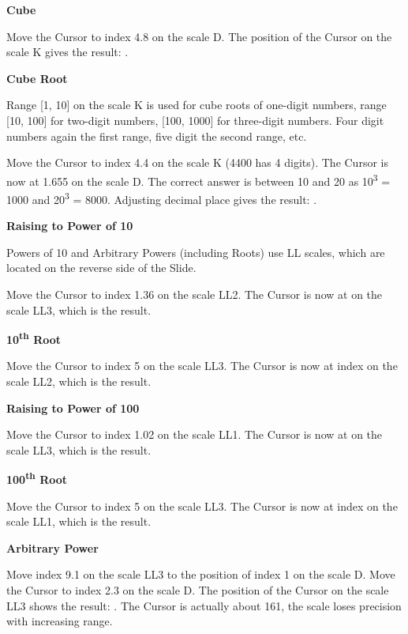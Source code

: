 \begin{multicols*}{3}
{  
  \textbf{Cube}

Move the Cursor to index 4.8 on the scale D.
The position of the Cursor on the scale K gives the result: .

  \textbf{Cube Root}

\footnotesize Range [1, 10] on the scale K is used for cube roots of one-digit numbers, range [10, 100] for two-digit numbers, [100, 1000] for three-digit numbers. Four digit numbers again the first range, five digit the second range, etc. \normalsize

Move the Cursor to index 4.4 on the scale K (4400 has 4 digits).
The Cursor is now at 1.655 on the scale D.
The correct answer is between 10 and 20 as 10\textsuperscript{3} = 1000 and 20\textsuperscript{3} = 8000. Adjusting decimal place gives the result: .

  \textbf{Raising to Power of 10}

\footnotesize Powers of 10 and Arbitrary Powers (including Roots) use LL scales, which are located on the reverse side of the Slide. \normalsize

Move the Cursor to index 1.36 on the scale LL2.
The Cursor is now at  on the scale LL3, which is the result.

  \textbf{10\textsuperscript{th} Root}

Move the Cursor to index 5 on the scale LL3.
The Cursor is now at index  on the scale LL2, which is the result.

  \textbf{Raising to Power of 100}

Move the Cursor to index 1.02 on the scale LL1.
The Cursor is now at  on the scale LL3, which is the result.

  \textbf{100\textsuperscript{th} Root}

Move the Cursor to index 5 on the scale LL3.
The Cursor is now at index  on the scale LL1, which is the result.

  \textbf{Arbitrary Power}

Move index 9.1 on the scale LL3 to the position of index 1 on the scale D.
Move the Cursor to index 2.3 on the scale D.
The position of the Cursor on the scale LL3 shows the result: . The Cursor is actually about 161, the scale loses precision with increasing range. 

}
\end{multicols*}
